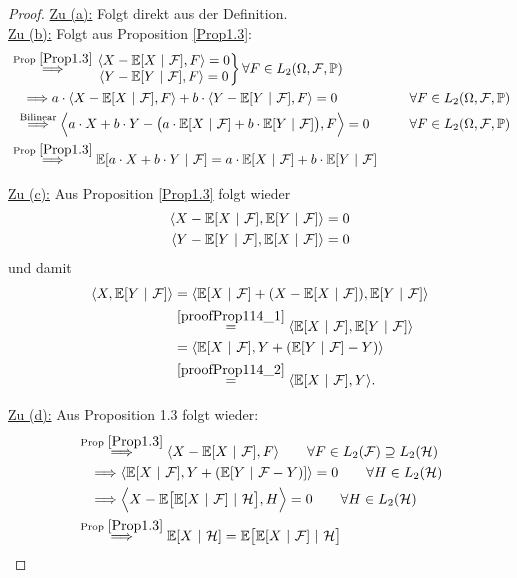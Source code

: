 \begin{proof}
\underline{Zu (a):} Folgt direkt aus der Definition.\\

\underline{Zu (b):} Folgt aus Proposition \ref{Prop1.3}:
\begin{align*}
&\stackrel{\text{Prop }\ref{Prop1.3}}{\Longrightarrow}
\left.
\begin{matrix}
\langle X-\mathbb{E}[X~|~\mathcal{F}],F\rangle=0\\
\langle Y-\mathbb{E}[Y~|~\mathcal{F}],F\rangle=0
\end{matrix}
\right\rbrace\forall F\in L_2(\Omega,\mathcal{F},\mathbb{P})\\
&~~~\Longrightarrow
a\cdot\langle X-\mathbb{E}[X~|~\mathcal{F}],F\rangle+b\cdot\langle Y-\mathbb{E}[Y~|~\mathcal{F}],F\rangle=0\qquad&\forall F\in L_2(\Omega,\mathcal{F},\mathbb{P})\\
&~\,\stackrel{\text{Bilinear}}{\Longrightarrow}
\Big\langle a\cdot X+b\cdot Y-\big(a\cdot\mathbb{E}[X~|~\mathcal{F}]+b\cdot \mathbb{E}[Y~|~\mathcal{F}]\big),F\Big\rangle=0\qquad&\forall F\in L_2(\Omega,\mathcal{F},\mathbb{P})\\
&\stackrel{\text{Prop }\ref{Prop1.3}}{\Longrightarrow}
\mathbb{E}[a\cdot X+b\cdot Y~|~\mathcal{F}]=a\cdot \mathbb{E}[X~|~\mathcal{F}]+b\cdot \mathbb{E}[Y~|~\mathcal{F}]
\end{align*}

\underline{Zu (c):} Aus Proposition \ref{Prop1.3} folgt wieder
\begin{align}
\langle X-\mathbb{E}[X~|~\mathcal{F}],\mathbb{E}[Y~|~\mathcal{F}]\rangle=0\label{proofProp114_1}\\
\langle Y-\mathbb{E}[Y~|~\mathcal{F}],\mathbb{E}[X~|~\mathcal{F}]\rangle=0\label{proofProp114_2}
\end{align}
und damit
\begin{align*}
\langle X,\mathbb{E}[Y~|~\mathcal{F}]\rangle
&=\langle \mathbb{E}[X~|~\mathcal{F}]+(X-\mathbb{E}[X~|~\mathcal{F}]),\mathbb{E}[Y~|~\mathcal{F}]\rangle\\
&\stackrel{\ref{proofProp114_1}}{=}
\langle\mathbb{E}[X~|~\mathcal{F}],\mathbb{E}[Y~|~\mathcal{F}]\rangle\\
&=\langle\mathbb{E}[X~|~\mathcal{F}],Y+(\mathbb{E}[Y~|~\mathcal{F}]-Y)\rangle\\
&\stackrel{\ref{proofProp114_2}}{=}
\langle\mathbb{E}[X~|~\mathcal{F}],Y\rangle.
\end{align*}

\underline{Zu (d):} 
Aus Proposition 1.3 folgt wieder:
\begin{align*}
&\stackrel{\text{Prop }\ref{Prop1.3}}{\Longrightarrow}
\langle X-\mathbb{E}[X~|~\mathcal{F}],F\rangle\qquad\forall F\in L_2(\mathcal{F})\supseteq L_2(\mathcal{H})\\
&~~~\Longrightarrow
\langle \mathbb{E}[X~|~\mathcal{F}],Y+(\mathbb{E}[Y~|~\mathcal{F}-Y)]\rangle=0\qquad\forall H\in L_2(\mathcal{H})\\
&~~~\Longrightarrow
\Big\langle X-\mathbb{E}\big[\mathbb{E}[X~|~\mathcal{F}]~|~\mathcal{H}\big],H\Big\rangle=0\qquad\forall H\in L_2(\mathcal{H})\\
&\stackrel{\text{Prop }\ref{Prop1.3}}{\Longrightarrow}
\mathbb{E}[X~|~\mathcal{H}]=\mathbb{E}\big[\mathbb{E}[X~|~\mathcal{F}]~|~\mathcal{H}\big]
\end{align*}


\end{proof}
